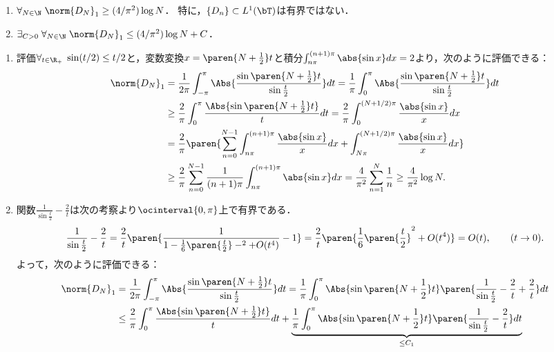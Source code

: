 \documentclass[uplatex,dvipdfmx]{jsreport}
\begin{document}
\begin{proposition}\mbox{}\label{prop-norm-of-Dirichlet-kernel}
    \begin{enumerate}
        \item $\forall_{N\in\N}\;\norm{D_N}_1\ge(4/\pi^2)\log N$．
        特に，$\{D_n\}\subset L^1(\bT)$は有界ではない．
        \item $\exists_{C>0}\;\forall_{N\in\N}\;\norm{D_N}_1\le(4/\pi^2)\log N+C$．
    \end{enumerate}
\end{proposition}
\begin{Proof}\mbox{}
    \begin{enumerate}
        \item 評価$\forall_{t\in\R_+}\;\sin(t/2)\le t/2$と，変数変換$x=\paren{N+\frac{1}{2}}t$と積分$\int^{(n+1)\pi}_{n\pi}\abs{\sin x}dx=2$より，次のように評価できる：
        \begin{align*}
            \norm{D_N}_1&=\frac{1}{2\pi}\int^\pi_{-\pi}\Abs{\frac{\sin\paren{N+\frac{1}{2}}t}{\sin\frac{t}{2}}}dt=\frac{1}{\pi}\int^\pi_{0}\Abs{\frac{\sin\paren{N+\frac{1}{2}}t}{\sin\frac{t}{2}}}dt\\
            &\ge\frac{2}{\pi}\int^\pi_{0}\frac{\Abs{\sin\paren{N+\frac{1}{2}}t}}{t}dt=\frac{2}{\pi} \int^{(N+1/2)\pi}_0 \frac{\abs{\sin x}}{x}dx\\
            &=\frac{2}{\pi}\paren{\sum_{n=0}^{N-1}\int^{(n+1)\pi}_{n\pi}\frac{\abs{\sin x}}{x}dx+\int^{(N+1/2)\pi}_{N\pi}\frac{\abs{\sin x}}{x}dx}\\
            &\ge\frac{2}{\pi}\sum_{n=0}^{N-1}\frac{1}{(n+1)\pi}\int^{(n+1)\pi}_{n\pi}\abs{\sin x}dx=\frac{4}{\pi^2}\sum_{n=1}^N\frac{1}{n}\ge\frac{4}{\pi^2}\log N.
        \end{align*}
        \item 関数$\frac{1}{\sin\frac{t}{2}}-\frac{2}{t}$は次の考察より$\ocinterval{0,\pi}$上で有界である．
        \[\frac{1}{\sin\frac{t}{2}}-\frac{2}{t}=\frac{2}{t}\paren{\frac{1}{1-\frac{1}{6}\paren{\frac{t}{2}}-^2+O(t^4)}-1}=\frac{2}{t}\paren{\frac{1}{6}\paren{\frac{t}{2}}^2+O(t^4)}=O(t),\qquad(t\to0).\]
        よって，次のように評価できる：
        \begin{align*}
        \norm{D_N}_1&=\frac{1}{2\pi}\int^\pi_{-\pi}\Abs{\frac{\sin\paren{N+\frac{1}{2}}t}{\sin\frac{t}{2}}}dt=\frac{1}{\pi}\int^\pi_{0}\Abs{\sin\paren{N+\frac{1}{2}}t}\paren{\frac{1}{\sin\frac{t}{2}}-\frac{2}{t}+\frac{2}{t}}dt\\
        &\le\frac{2}{\pi}\int^\pi_0\frac{\Abs{\sin\paren{N+\frac{1}{2}}t}}{t}dt+\underbrace{\frac{1}{\pi}\int^\pi_0\Abs{\sin\paren{N+\frac{1}{2}}t}\paren{\frac{1}{\sin\frac{t}{2}}-\frac{2}{t}}dt}_{\le C_1}\\

\end{align*}
\end{enumerate}
\end{Proof}
\end{document}

